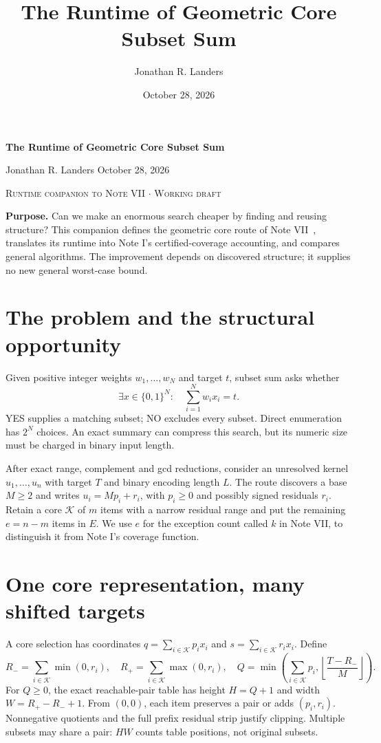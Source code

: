 \documentclass[10pt,english]{article}
\title{\sffamily\bfseries The Runtime of Geometric Core Subset Sum}
\author{Jonathan R. Landers}
\date{October 28, 2026}
\begin{document}
{\LARGE\sffamily\bfseries The Runtime of Geometric Core Subset Sum}\par
\vspace{3pt}
{\small Jonathan R. Landers \hfill October 28, 2026}\par
\noindent\textcolor{paperaccent}{\footnotesize\textsc{Runtime companion to Note VII $\cdot$ Working draft}}

\begin{tcolorbox}[accentbox]
\textbf{Purpose.} Can we make an enormous search cheaper by finding and reusing structure? This companion defines the geometric core route of Note VII~\cite{vii}, translates its runtime into Note I's certified-coverage accounting, and compares general algorithms. The improvement depends on discovered structure; it supplies no new general worst-case bound.
\end{tcolorbox}

\section{The problem and the structural opportunity}
Given positive integer weights $w_1,\ldots,w_N$ and target $t$, subset sum asks whether
$$
\exists x\in\{0,1\}^N:\quad \sum_{i=1}^N w_ix_i=t.
$$
YES supplies a matching subset; NO excludes every subset. Direct enumeration has $2^N$ choices. An exact summary can compress this search, but its numeric size must be charged in binary input length.

After exact range, complement and gcd reductions, consider an unresolved kernel $u_1,\ldots,u_n$ with target $T$ and binary encoding length $L$. The route discovers a base $M\ge2$ and writes $u_i=Mp_i+r_i$, with $p_i\ge0$ and possibly signed residuals $r_i$. Retain a core $\mathcal K$ of $m$ items with a narrow residual range and put the remaining $e=n-m$ items in $E$. We use $e$ for the exception count called $k$ in Note VII, to distinguish it from Note I's coverage function.

\section{One core representation, many shifted targets}
A core selection has coordinates $q=\sum_{i\in\mathcal K}p_ix_i$ and $s=\sum_{i\in\mathcal K}r_ix_i$. Define
$$
R_-=\sum_{i\in\mathcal K}\min(0,r_i),\quad R_+=\sum_{i\in\mathcal K}\max(0,r_i),\quad
Q=\min\left(\sum_{i\in\mathcal K}p_i,\left\lfloor\frac{T-R_-}{M}\right\rfloor\right).
$$
For $Q\ge0$, the exact reachable-pair table has height $H=Q+1$ and width $W=R_+-R_-+1$. From $(0,0)$, each item preserves a pair or adds $(p_i,r_i)$. Nonnegative quotients and the full prefix residual strip justify clipping. Multiple subsets may share a pair: $HW$ counts table positions, not original subsets.
\end{document}
